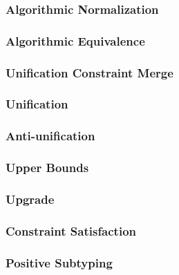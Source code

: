 \subsubsection{Algorithmic Normalization}


\subsubsection{Algorithmic Equivalence}


\subsubsection{Unification Constraint Merge}


\subsubsection{Unification}


\subsubsection{Anti-unification}


\subsubsection{Upper Bounds}
\label{sec:alg-upper-bounds-statements}


\subsubsection{Upgrade}
\label{sec:upgrade-statements}


\subsubsection{Constraint Satisfaction}


\subsubsection{Positive Subtyping}


